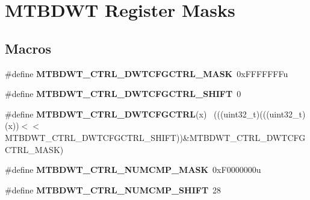 \hypertarget{group___m_t_b_d_w_t___register___masks}{}\section{M\+T\+B\+D\+W\+T Register Masks}
\label{group___m_t_b_d_w_t___register___masks}
\subsection*{Macros}
\begin{DoxyCompactItemize}
\item 
\hypertarget{group___m_t_b_d_w_t___register___masks_ga9e40278e7b92b2e6b986112b6e2dddc3}{}\#define {\bfseries M\+T\+B\+D\+W\+T\+\_\+\+C\+T\+R\+L\+\_\+\+D\+W\+T\+C\+F\+G\+C\+T\+R\+L\+\_\+\+M\+A\+S\+K}~0x\+F\+F\+F\+F\+F\+F\+Fu\label{group___m_t_b_d_w_t___register___masks_ga9e40278e7b92b2e6b986112b6e2dddc3}

\item 
\hypertarget{group___m_t_b_d_w_t___register___masks_gad6dd05558d41419cb9f877533730598a}{}\#define {\bfseries M\+T\+B\+D\+W\+T\+\_\+\+C\+T\+R\+L\+\_\+\+D\+W\+T\+C\+F\+G\+C\+T\+R\+L\+\_\+\+S\+H\+I\+F\+T}~0\label{group___m_t_b_d_w_t___register___masks_gad6dd05558d41419cb9f877533730598a}

\item 
\hypertarget{group___m_t_b_d_w_t___register___masks_ga2815d02c2137ac71498ed0ad09c8a72a}{}\#define {\bfseries M\+T\+B\+D\+W\+T\+\_\+\+C\+T\+R\+L\+\_\+\+D\+W\+T\+C\+F\+G\+C\+T\+R\+L}(x)                            ~(((uint32\+\_\+t)(((uint32\+\_\+t)(x))$<$$<$M\+T\+B\+D\+W\+T\+\_\+\+C\+T\+R\+L\+\_\+\+D\+W\+T\+C\+F\+G\+C\+T\+R\+L\+\_\+\+S\+H\+I\+F\+T))\&M\+T\+B\+D\+W\+T\+\_\+\+C\+T\+R\+L\+\_\+\+D\+W\+T\+C\+F\+G\+C\+T\+R\+L\+\_\+\+M\+A\+S\+K)\label{group___m_t_b_d_w_t___register___masks_ga2815d02c2137ac71498ed0ad09c8a72a}

\item 
\hypertarget{group___m_t_b_d_w_t___register___masks_ga846eb798600a6cbb83fb5343120b87e6}{}\#define {\bfseries M\+T\+B\+D\+W\+T\+\_\+\+C\+T\+R\+L\+\_\+\+N\+U\+M\+C\+M\+P\+\_\+\+M\+A\+S\+K}~0x\+F0000000u\label{group___m_t_b_d_w_t___register___masks_ga846eb798600a6cbb83fb5343120b87e6}

\item 
\hypertarget{group___m_t_b_d_w_t___register___masks_ga8ae4e5abf11db57b34a826de0cd5e562}{}\#define {\bfseries M\+T\+B\+D\+W\+T\+\_\+\+C\+T\+R\+L\+\_\+\+N\+U\+M\+C\+M\+P\+\_\+\+S\+H\+I\+F\+T}~28\label{group___m_t_b_d_w_t___register___masks_ga8ae4e5abf11db57b34a826de0cd5e562}


\end{DoxyCompactItemize}

